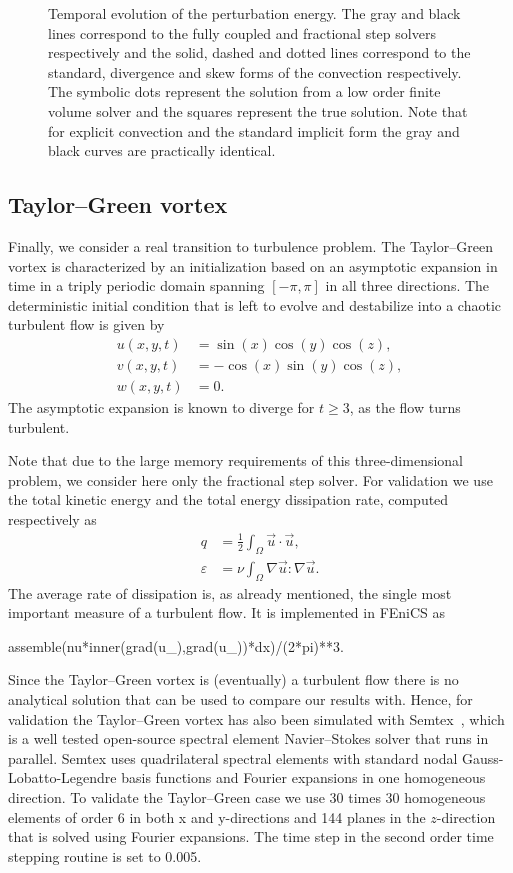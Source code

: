 \begin{figure}
 \caption{Temporal evolution of the perturbation energy. The gray and
   black lines correspond to the fully coupled and fractional step
   solvers respectively and the solid, dashed and dotted lines
   correspond to the standard, divergence and skew forms of the
   convection respectively. The symbolic dots represent the solution
   from a low order finite volume solver and the squares represent the
   true solution. Note that for explicit convection and the standard
   implicit form the gray and black curves are practically
   identical. }
\label{fig:mortensen:OS_long_time}
\end{figure}

\subsection{Taylor--Green vortex}
\label{sec:mortensen:TG}
Finally, we consider a real transition to turbulence problem. The
Taylor--Green vortex is characterized by an initialization based on an
asymptotic expansion in time in a triply periodic domain spanning
$[-\pi,\pi]$ in all three directions. The deterministic initial
condition that is left to evolve and destabilize into a chaotic
turbulent flow is given by
\begin{align}
 u(x,y,t)&=\sin(x)\cos(y)\cos(z),\\
 v(x,y,t)&=-\cos(x)\sin(y)\cos(z),\\
 w(x,y,t)&=0.
\end{align}
The asymptotic expansion is known to diverge for $t \ge 3$, as the
flow turns turbulent.

Note that due to the large memory requirements of this
three-dimensional problem, we consider here only the fractional step
solver. For validation we use the total kinetic energy and the total
energy dissipation rate, computed respectively as
\begin{align}
 q &= \frac{1}{2} \int_{\Omega} \vec{u} \cdot \vec{u}, \label{eq:mortensen:q} \\
 \varepsilon &= \nu \int_{\Omega} \nabla \vec{u}: \nabla \vec{u}. \label{eq:mortensen:diss}
\end{align}
The average rate of dissipation is, as already mentioned, the single most important measure of a turbulent flow. It is implemented in FEniCS as
\begin{python}
   assemble(nu*inner(grad(u_),grad(u_))*dx)/(2*pi)**3.
\end{python}

Since the Taylor--Green vortex is (eventually) a turbulent flow there
is no analytical solution that can be used to compare our results
with. Hence, for validation the Taylor--Green vortex has also been
simulated with Semtex~\citep{Blackburn2009}, which is a well tested
open-source spectral element Navier--Stokes solver that runs in
parallel. Semtex uses quadrilateral spectral elements with standard
nodal Gauss-Lobatto-Legendre basis functions and Fourier expansions in
one homogeneous direction. To validate the Taylor--Green case we use 30
times 30 homogeneous elements of order 6 in both x and y-directions
and 144 planes in the $z$-direction that is solved using Fourier
expansions. The time step in the second order time stepping routine is
set to 0.005.

